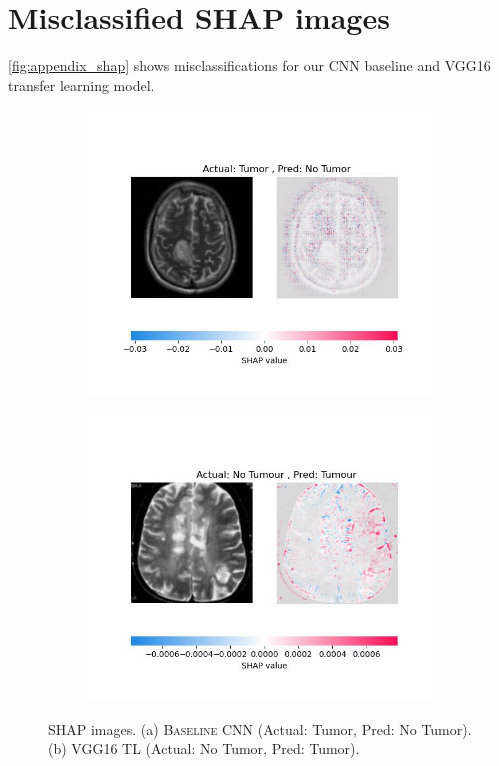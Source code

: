 \newpage
\appendix

\section{Misclassified SHAP images}
\label{sec:appendix_misclassified}
\autoref{fig:appendix_shap} shows misclassifications for our CNN baseline and VGG16 transfer learning model.

\begin{figure}[b]
\centering
\begin{subfigure}{0.5\linewidth}
  \centering
    \includegraphics[width=1\linewidth]{figures/baseline_cnn_incorrect_shap.jpeg}
    \caption{}
    \label{fig:baseline_cnn_incorrect_shap}
\end{subfigure}%
\begin{subfigure}{0.5\linewidth}
  \centering
    \includegraphics[width=1\linewidth]{figures/transfer_learning_incorrect_shap.jpeg}
    \caption{}
    \label{fig:transfer_learning_incorrect_shap}
\end{subfigure}
\caption{SHAP images. (a) \textsc{Baseline CNN} (Actual: Tumor, Pred: No Tumor). (b) \textsc{VGG16 TL} (Actual: No Tumor, Pred: Tumor).}
\label{fig:appendix_shap}
\end{figure}
